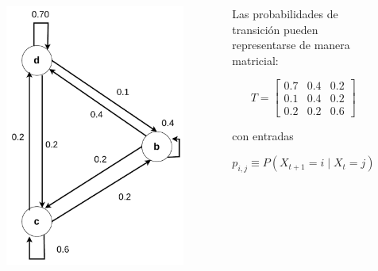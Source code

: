 \documentclass[11pt]{beamer}
\begin{document}
\begin{frame}
	\begin{columns}
		\begin{column}{0.5\textwidth}
			\vspace{-0.5cm}
			\begin{figure}
				\includegraphics[scale=0.5]{images/markov_cuatro.pdf}
			\end{figure}
		\end{column}
		\begin{column}{0.5\textwidth}
			Las probabilidades de transición pueden representarse de manera matricial:
			
			\begin{equation}
			T = \begin{bmatrix}
			0.7 & 0.4 & 0.2\\
			0.1 & 0.4 & 0.2\\
			0.2 & 0.2 & 0.6
			\end{bmatrix}
			\end{equation}

			con entradas
			
			\[p_{i,j} \equiv P(X_{t+1} = i \mid X_t =j)\]

		\end{column}

	\end{columns}
	
\end{frame}
\end{document}
